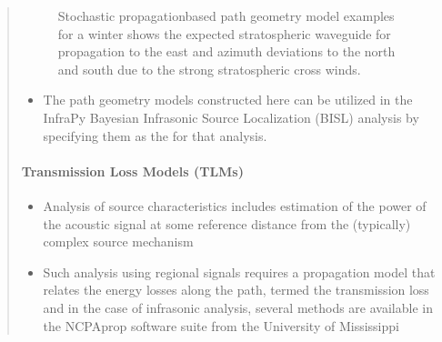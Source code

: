 \documentclass[letterpaper,10pt,english]{sphinxmanual}
\let\sphinxpxdimen\pdfpxdimen\else\newdimen\sphinxpxdimen
\begin{document}
\begin{itemize}
\begin{quote}
\begin{figure}[htbp]
\centering
\capstart

\noindent\sphinxincludegraphics[width=850\sphinxpxdimen]{{winter-PGMs}.jpg}
\caption{Stochastic propagation\sphinxhyphen{}based path geometry model examples for a winter shows the expected stratospheric waveguide for propagation to the east and azimuth deviations to the north and south due to the strong stratospheric cross winds.}\label{\detokenize{propagation:id3}}\end{figure}
\begin{itemize}
\item {} 
\sphinxAtStartPar
The path geometry models constructed here can be utilized in the InfraPy Bayesian Infrasonic Source Localization (BISL) analysis by specifying them as the  for that analysis.

\end{itemize}

\begin{sphinxVerbatim}[commandchars=\\\{\}]
   

  
    
\end{sphinxVerbatim}


\paragraph{Transmission Loss Models (TLMs)}
\label{\detokenize{propagation:transmission-loss-models-tlms}}\begin{itemize}
\item {} 
\sphinxAtStartPar
Analysis of source characteristics includes estimation of the power of the acoustic signal at some reference distance from the (typically) complex source mechanism

\item {} 
\sphinxAtStartPar
Such analysis using regional signals requires a propagation model that relates the energy losses along the path, termed the transmission loss and in the case of infrasonic analysis, several methods are available in the NCPAprop software suite from the University of Mississippi


\end{itemize}
\end{quote}
\end{itemize}
\end{document}
